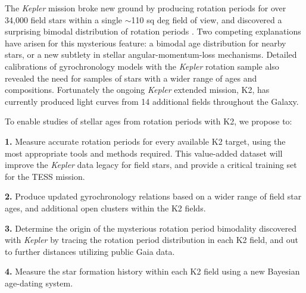 \documentclass[12pt]{article}
\newcommand{\Kepler}{\textsl{Kepler}\xspace}
\begin{document}
The \Kepler mission broke new ground by producing rotation periods for over
34,000 field stars within a single $\sim$110 sq deg field of view, and
discovered a surprising bimodal distribution of rotation periods
\citep{mcquillan2014}.
Two competing explanations have arisen for this mysterious feature: a bimodal
age distribution for nearby stars, or a new subtlety in stellar
angular-momentum-loss mechanisms.
Detailed calibrations of gyrochronology models with the \Kepler rotation
sample also revealed the need for samples of stars with a wider range of ages
and compositions.
Fortunately the ongoing \Kepler extended mission, K2, has currently produced
light curves from 14 additional fields throughout the Galaxy.

To enable studies of stellar ages from rotation periods with K2, we propose
to:

{\bf 1.} Measure accurate rotation periods for every available K2 target,
using the most appropriate tools and methods required.
This value-added dataset will improve the \Kepler data legacy for field stars,
and provide a critical training set for the TESS mission.

{\bf 2.} Produce updated gyrochronology relations based on a wider range of
field star ages, and additional open clusters within the K2 fields.

{\bf 3.} Determine the origin of the mysterious rotation period bimodality
discovered with \Kepler by tracing the rotation period distribution in each K2
field, and out to further distances utilizing public Gaia data.

{\bf 4.} Measure the star formation history within each K2 field using a new
Bayesian age-dating system.



\clearpage



\end{document}
